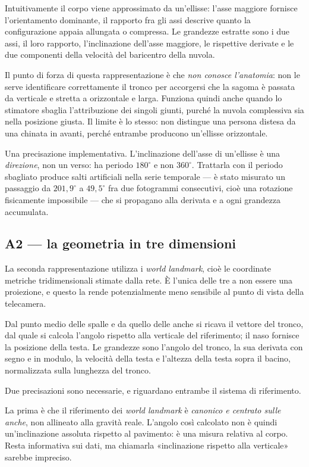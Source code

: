 Intuitivamente il corpo viene approssimato da un'ellisse: l'asse maggiore
fornisce l'orientamento dominante, il rapporto fra gli assi descrive quanto la
configurazione appaia allungata o compressa. Le grandezze estratte sono i due
assi, il loro rapporto, l'inclinazione dell'asse maggiore, le rispettive
derivate e le due componenti della velocità del baricentro della nuvola.

Il punto di forza di questa rappresentazione è che \emph{non conosce
l'anatomia}: non le serve identificare correttamente il tronco per accorgersi
che la sagoma è passata da verticale e stretta a orizzontale e larga. Funziona
quindi anche quando lo stimatore sbaglia l'attribuzione dei singoli giunti,
purché la nuvola complessiva sia nella posizione giusta. Il limite è lo stesso:
non distingue una persona distesa da una chinata in avanti, perché entrambe
producono un'ellisse orizzontale.

Una precisazione implementativa. L'inclinazione dell'asse di un'ellisse è una
\emph{direzione}, non un verso: ha periodo $180^\circ$ e non $360^\circ$.
Trattarla con il periodo sbagliato produce salti artificiali nella serie
temporale — è stato misurato un passaggio da $201{,}9^\circ$ a $49{,}5^\circ$
fra due fotogrammi consecutivi, cioè una rotazione fisicamente impossibile — che
si propagano alla derivata e a ogni grandezza accumulata.

\subsection{A2 --- la geometria in tre dimensioni}

La seconda rappresentazione utilizza i \emph{world landmark}, cioè le coordinate
metriche tridimensionali stimate dalla rete. È l'unica delle tre a non essere
una proiezione, e questo la rende potenzialmente meno sensibile al punto di
vista della telecamera.

Dal punto medio delle spalle e da quello delle anche si ricava il vettore del
tronco, dal quale si calcola l'angolo rispetto alla verticale del riferimento;
il naso fornisce la posizione della testa. Le grandezze sono l'angolo del
tronco, la sua derivata con segno e in modulo, la velocità della testa e
l'altezza della testa sopra il bacino, normalizzata sulla lunghezza del tronco.

Due precisazioni sono necessarie, e riguardano entrambe il sistema di
riferimento.

La prima è che il riferimento dei \emph{world landmark} è \emph{canonico e
centrato sulle anche}, non allineato alla gravità reale. L'angolo così calcolato
non è quindi un'inclinazione assoluta rispetto al pavimento: è una misura
relativa al corpo. Resta informativa sui dati, ma chiamarla «inclinazione
rispetto alla verticale» sarebbe impreciso.

